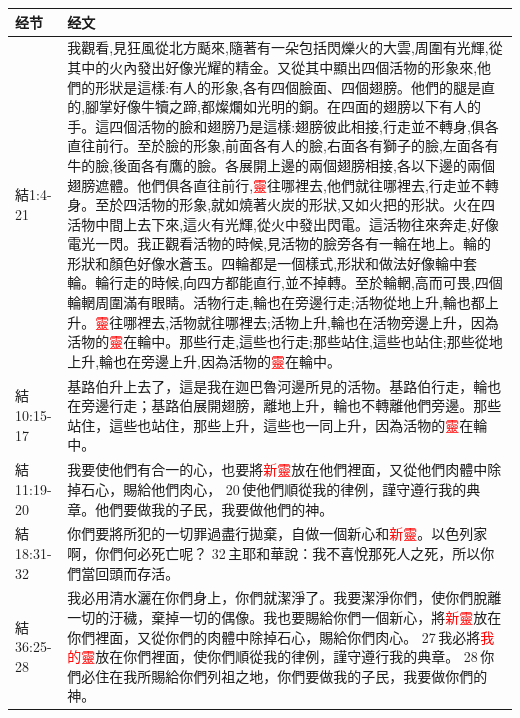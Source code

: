 \begin{table}[H]
\centering
\begin{tabular}{p{5em}p{45em}}  \toprule
经节&经文 \\  \midrule

結1:4-21&我觀看,見狂風從北方颳來,隨著有一朵包括閃爍火的大雲,周圍有光輝,從其中的火內發出好像光耀的精金。又從其中顯出四個活物的形象來,他們的形狀是這樣:有人的形象,各有四個臉面、四個翅膀。他們的腿是直的,腳掌好像牛犢之蹄,都燦爛如光明的銅。在四面的翅膀以下有人的手。這四個活物的臉和翅膀乃是這樣:翅膀彼此相接,行走並不轉身,俱各直往前行。至於臉的形象,前面各有人的臉,右面各有獅子的臉,左面各有牛的臉,後面各有鷹的臉。各展開上邊的兩個翅膀相接,各以下邊的兩個翅膀遮體。他們俱各直往前行,\textcolor{red}{靈}往哪裡去,他們就往哪裡去,行走並不轉身。至於四活物的形象,就如燒著火炭的形狀,又如火把的形狀。火在四活物中間上去下來,這火有光輝,從火中發出閃電。這活物往來奔走,好像電光一閃。我正觀看活物的時候,見活物的臉旁各有一輪在地上。輪的形狀和顏色好像水蒼玉。四輪都是一個樣式,形狀和做法好像輪中套輪。輪行走的時候,向四方都能直行,並不掉轉。至於輪輞,高而可畏,四個輪輞周圍滿有眼睛。活物行走,輪也在旁邊行走;活物從地上升,輪也都上升。\textcolor{red}{靈}往哪裡去,活物就往哪裡去;活物上升,輪也在活物旁邊上升，因為活物的\textcolor{red}{靈}在輪中。那些行走,這些也行走;那些站住,這些也站住;那些從地上升,輪也在旁邊上升,因為活物的\textcolor{red}{靈}在輪中。 \\  \midrule
結10:15-17&基路伯升上去了，這是我在迦巴魯河邊所見的活物。基路伯行走，輪也在旁邊行走；基路伯展開翅膀，離地上升，輪也不轉離他們旁邊。那些站住，這些也站住，那些上升，這些也一同上升，因為活物的\textcolor{red}{靈}在輪中。\\  \midrule



結11:19-20&我要使他們有合一的心，也要將\textcolor{red}{新靈}放在他們裡面，又從他們肉體中除掉石心，賜給他們肉心， 20 使他們順從我的律例，謹守遵行我的典章。他們要做我的子民，我要做他們的神。 \\  \midrule




結18:31-32&你們要將所犯的一切罪過盡行拋棄，自做一個新心和\textcolor{red}{新靈}。以色列家啊，你們何必死亡呢？ 32 主耶和華說：我不喜悅那死人之死，所以你們當回頭而存活。\\  \midrule

結36:25-28&我必用清水灑在你們身上，你們就潔淨了。我要潔淨你們，使你們脫離一切的汙穢，棄掉一切的偶像。我也要賜給你們一個新心，將\textcolor{red}{新靈}放在你們裡面，又從你們的肉體中除掉石心，賜給你們肉心。 27 我必將\textcolor{red}{我的靈}放在你們裡面，使你們順從我的律例，謹守遵行我的典章。 28 你們必住在我所賜給你們列祖之地，你們要做我的子民，我要做你們的神。\\  \midrule


\end{tabular}
\end{table}
